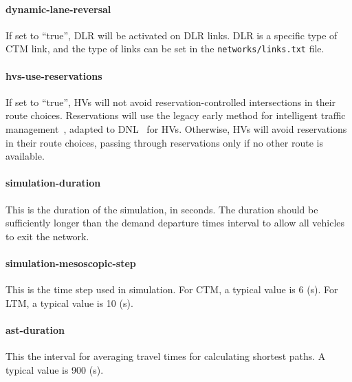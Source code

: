 \paragraph*{dynamic-lane-reversal}
If set to ``true'', DLR will be activated on DLR links. DLR is a specific type of CTM link, and the type of links can be set in the \texttt{networks/links.txt} file.

\paragraph*{hvs-use-reservations}
If set to ``true'', HVs will not avoid reservation-controlled intersections in their route choices. Reservations will use the legacy early method for intelligent traffic management~\cite{conde2013intelligent}, adapted to DNL~\cite{levin2016multiclass} for HVs. Otherwise, HVs will avoid reservations in their route choices, passing through reservations only if no other route is available.

\paragraph*{simulation-duration}
This is the duration of the simulation, in seconds. The duration should be sufficiently longer than the demand departure times interval to allow all vehicles to exit the network.

\paragraph*{simulation-mesoscopic-step}
This is the time step used in simulation. For CTM, a typical value is 6 (s). For LTM, a typical value is 10 (s).

\paragraph*{ast-duration}
This the interval for averaging travel times for calculating shortest paths. A typical value is 900 (s).













